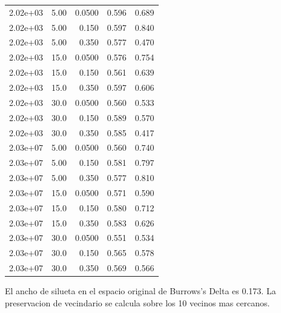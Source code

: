 \begin{table}[htbp]
\begin{tabular}{lrrrr}
2.02e+03 & 5.00 & 0.0500 & 0.596 & 0.689 \\
2.02e+03 & 5.00 & 0.150 & 0.597 & 0.840 \\
2.02e+03 & 5.00 & 0.350 & 0.577 & 0.470 \\
2.02e+03 & 15.0 & 0.0500 & 0.576 & 0.754 \\
2.02e+03 & 15.0 & 0.150 & 0.561 & 0.639 \\
2.02e+03 & 15.0 & 0.350 & 0.597 & 0.606 \\
2.02e+03 & 30.0 & 0.0500 & 0.560 & 0.533 \\
2.02e+03 & 30.0 & 0.150 & 0.589 & 0.570 \\
2.02e+03 & 30.0 & 0.350 & 0.585 & 0.417 \\
2.03e+07 & 5.00 & 0.0500 & 0.560 & 0.740 \\
2.03e+07 & 5.00 & 0.150 & 0.581 & 0.797 \\
2.03e+07 & 5.00 & 0.350 & 0.577 & 0.810 \\
2.03e+07 & 15.0 & 0.0500 & 0.571 & 0.590 \\
2.03e+07 & 15.0 & 0.150 & 0.580 & 0.712 \\
2.03e+07 & 15.0 & 0.350 & 0.583 & 0.626 \\
2.03e+07 & 30.0 & 0.0500 & 0.551 & 0.534 \\
2.03e+07 & 30.0 & 0.150 & 0.565 & 0.578 \\
2.03e+07 & 30.0 & 0.350 & 0.569 & 0.566 \\
\bottomrule
\end{tabular}
\vspace{0.5em}
\begin{minipage}{\linewidth}\footnotesize El ancho de silueta en el espacio original de Burrows's Delta es 0.173. La preservacion de vecindario se calcula sobre los 10 vecinos mas cercanos.\end{minipage}
\end{table}

